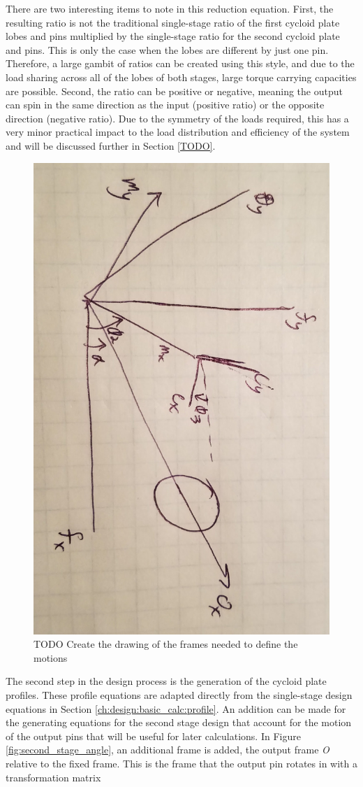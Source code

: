 There are two interesting items to note in this reduction equation. First, the resulting ratio is not the traditional single-stage ratio of the first cycloid plate lobes and pins multiplied by the single-stage ratio for the second cycloid plate and pins. This is only the case when the lobes are different by just one pin. Therefore, a large gambit of ratios can be created using this style, and due to the load sharing across all of the lobes of both stages, large torque carrying capacities are possible. Second, the ratio can be positive or negative, meaning the output can spin in the same direction as the input (positive ratio) or the opposite direction (negative ratio). Due to the symmetry of the loads required, this has a very minor practical impact to the load distribution and efficiency of the system and will be discussed further in Section \ref{TODO}. 

\begin{figure}[h]
	\centering
	\includegraphics[angle=90,width=0.50\linewidth]{fig/two_stage_frames_TODO}
   \caption{TODO Create the drawing of the frames needed to define the motions}
   \label{fig:two_stage_frame}
\end{figure}

The second step in the design process is the generation of the cycloid plate profiles. These profile equations are adapted directly from the single-stage design equations in Section \ref{ch:design:basic_calc:profile}. An addition can be made for the generating equations for the second stage design that account for the motion of the output pins that will be useful for later calculations. In Figure \ref{fig:second_stage_angle}, an additional frame is added, the output frame \textit{O} relative to the fixed frame. This is the frame that the output pin rotates in with a transformation matrix 

